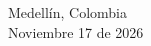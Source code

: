 \begin{titlepage}
\begin{minipage}{13.5cm}
{\large
Medellín, Colombia
}\\[0.3cm]

{\large
Noviembre 17 de 2026
}

\end{minipage}

\vfill %

\end{titlepage}




